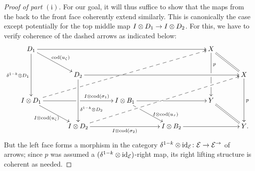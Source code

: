\documentclass[reqno,10pt,a4paper,oneside,draft]{amsart}
\begin{document}
\begin{proof}[Proof of part $\mathrm{(i)}$]
For our goal, it will thus suffice to show that the maps from the back to the front face coherently extend similarly.
This is canonically the case except potentially for the top middle map $I \otimes D_1 \to I \otimes D_2$.
For this, we have to verify coherence of the dashed arrows as indicated below:
\[
\xymatrix@C+1em{
  D_1
  \ar[rrrr]
  \ar[dd]_{\kcylinv \otimes D_1}
  \ar[dr]^{\cod(u_{\zeta})}
&&&&
  X
  \ar[dd]^(0.3){p}|!{[dlll];[dr]}{\hole}|!{[dddlll];[dr]}{\hole}
  \ar@{=}[dr]
\\&
  D_2
  \ar[rrrr]
  \ar[dd]^(0.66){\kcylinv \otimes D_2}
&&&&
  X
  \ar[dd]^{p}
\\
  \interval \otimes D_1
  \ar[rr]^(0.7){I \otimes \cod(\sigma_1)}|!{[ur];[dr]}{\hole}
  \ar@{-->}[uurrrr]|!{[ur];[dr]}{\hole}|!{[ur];[urrrrr]}{\hole} %
  \ar[dr]_{I \otimes \cod(u_{\zeta})}
&&
  \interval \otimes B_1
  \ar[rr]|!{[dl];[urrr]}{\hole}
  \ar[dr]^(0.7){\interval \otimes \cod(u_\tau)}|!{[dl];[urrr]}{\hole}
&&
  Y
  \ar@{=}[dr]
\\&
  \interval \otimes D_2
  \ar[rr]_{I \otimes \cod(\sigma_2)}
  \ar@{-->}[uurrrr]
&&
  \interval \otimes B_2
  \ar[rr]
&&
  Y
\rlap{.}}
\]
But the left face forms a morphism in the category $\delta^{1-k} \otimes \operatorname{id}_{\mathcal{E}} \colon \mathcal{E} \to \mathcal{E}^\to$ of arrows; since $p$ was assumed a $(\delta^{1-k} \otimes \operatorname{id}_{\mathcal{E}})$-right map, its right lifting structure is coherent as needed.
\end{proof}
\end{document}

